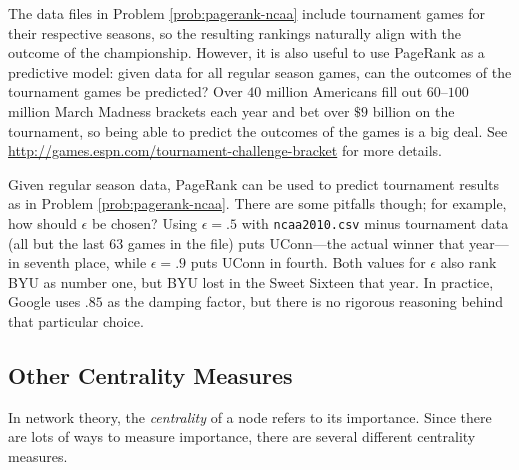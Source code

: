 The data files in Problem \ref{prob:pagerank-ncaa} include tournament games for their respective seasons, so the resulting rankings naturally align with the outcome of the championship.
However, it is also useful to use PageRank as a predictive model: given data for all regular season games, can the outcomes of the tournament games be predicted?
Over $40$ million Americans fill out $60$--$100$ million March Madness brackets each year and bet over $\$9$ billion on the tournament, so being able to predict the outcomes of the games is a big deal.
See \url{http://games.espn.com/tournament-challenge-bracket} for more details.

Given regular season data, PageRank can be used to predict tournament results as in Problem \ref{prob:pagerank-ncaa}.
There are some pitfalls though; for example, how should $\epsilon$ be chosen?
Using $\epsilon = .5$ with \texttt{ncaa2010.csv} minus tournament data (all but the last 63 games in the file) puts UConn---the actual winner that year---in seventh place, while $\epsilon = .9$ puts UConn in fourth.
Both values for $\epsilon$ also rank BYU as number one, but BYU lost in the Sweet Sixteen that year.
In practice, Google uses $.85$ as the damping factor, but there is no rigorous reasoning behind that particular choice.

\subsection*{Other Centrality Measures} %

In network theory, the \emph{centrality} of a node refers to its importance.
Since there are lots of ways to measure importance, there are several different centrality measures.

